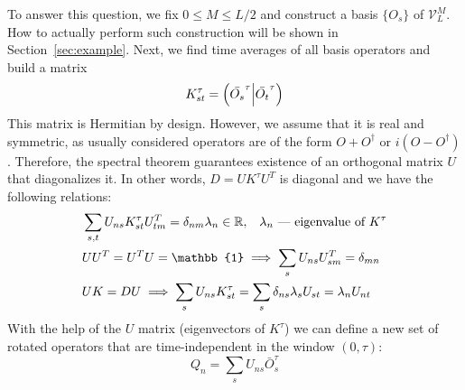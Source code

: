 To answer this question, we fix \(0\leq M \leq L/2\) and construct a basis \(\{O_s\}\) of \(\mathcal{V}_L^M\). How to actually perform such construction
will be shown in Section~\ref{sec:example}. Next, we find time averages of all basis operators and build a matrix
\begin{equation}
  K_{st}^{\tau} = \left(\bar{O_s}^{\tau} \middle| \bar{O_t}^{\tau}\right)
\end{equation}
This matrix is Hermitian by design. However, we assume that it is real and symmetric, 
as usually considered operators are of the form \(O+O^{\dagger}\) or \(i\left(O-O^{\dagger}\right)\).
Therefore, the spectral theorem guarantees existence of an orthogonal matrix \(U\) that
diagonalizes it. In other words, \(D = UK^{\tau}U^{T}\) is diagonal and we have the following relations:
\begin{align}
  &\sum_{s, t} U_{n s} K_{s t}^{\tau} U_{t m}^{T}=\delta_{nm} \lambda_{n} \in \RR,\;\;\; \lambda_n \text{ --- eigenvalue of }K^{\tau} \nonumber \\
  &UU^{T} = U^{T}U = \mathbb{1} \implies \sum_{s} U_{ns}U_{sm}^{T} = \delta_{mn}\nonumber\\
  & U K = D U \implies \sum_s U_{ns} K_{st}^{\tau} = \sum_s  \delta_{ns} \lambda_s U_{st} = \lambda_n U_{nt}\label{eq:properties}
\end{align} 
With the help of the \(U\) matrix (eigenvectors of \(K^{\tau}\)) we can define a new set of rotated operators that
are time-independent in the window \(\left(0,\tau\right)\):
\begin{equation}
  Q_n = \sum_s U_{ns}\bar{O}_{s}^{\tau}\label{eq:new operators}
\end{equation} 

